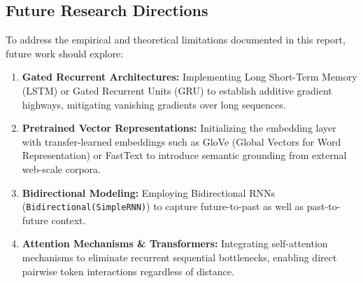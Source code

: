 \documentclass[11pt,a4paper]{article}
\begin{document}
\subsection{Future Research Directions}
To address the empirical and theoretical limitations documented in this report, future work should explore:
\begin{enumerate}
    \item \textbf{Gated Recurrent Architectures:} Implementing Long Short-Term Memory (LSTM) or Gated Recurrent Units (GRU) to establish additive gradient highways, mitigating vanishing gradients over long sequences.
    \item \textbf{Pretrained Vector Representations:} Initializing the embedding layer with transfer-learned embeddings such as GloVe (Global Vectors for Word Representation) or FastText to introduce semantic grounding from external web-scale corpora.
    \item \textbf{Bidirectional Modeling:} Employing Bidirectional RNNs (\texttt{Bidirectional(SimpleRNN)}) to capture future-to-past as well as past-to-future context.
    \item \textbf{Attention Mechanisms \& Transformers:} Integrating self-attention mechanisms to eliminate recurrent sequential bottlenecks, enabling direct pairwise token interactions regardless of distance.
\end{enumerate}
\end{document}
